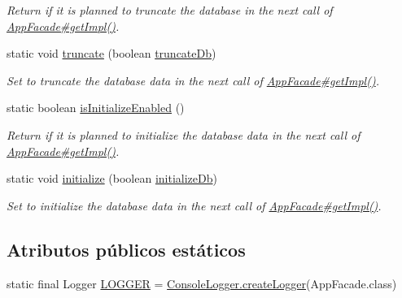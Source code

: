 \begin{DoxyCompactItemize}
\begin{DoxyCompactList}\small\item\em Return if it is planned to truncate the database in the next call of \mbox{\hyperlink{classcom_1_1ruralhousejsf_1_1business_logic_1_1_app_facade_a029bcceee98b9070b9f80abc54db45d6}{App\+Facade\#get\+Impl()}}. \end{DoxyCompactList}\item 
static void \mbox{\hyperlink{classcom_1_1ruralhousejsf_1_1business_logic_1_1_app_facade_a98aed1ed8a03c6a92e15121fed4eb452}{truncate}} (boolean \mbox{\hyperlink{classcom_1_1ruralhousejsf_1_1business_logic_1_1_app_facade_ac9cbe77035be5cc1f9bf258c57ca6564}{truncate\+Db}})
\begin{DoxyCompactList}\small\item\em Set to truncate the database data in the next call of \mbox{\hyperlink{classcom_1_1ruralhousejsf_1_1business_logic_1_1_app_facade_a029bcceee98b9070b9f80abc54db45d6}{App\+Facade\#get\+Impl()}}. \end{DoxyCompactList}\item 
static boolean \mbox{\hyperlink{classcom_1_1ruralhousejsf_1_1business_logic_1_1_app_facade_a0486115e3ba238d025e23ec62548b3bc}{is\+Initialize\+Enabled}} ()
\begin{DoxyCompactList}\small\item\em Return if it is planned to initialize the database data in the next call of \mbox{\hyperlink{classcom_1_1ruralhousejsf_1_1business_logic_1_1_app_facade_a029bcceee98b9070b9f80abc54db45d6}{App\+Facade\#get\+Impl()}}. \end{DoxyCompactList}\item 
static void \mbox{\hyperlink{classcom_1_1ruralhousejsf_1_1business_logic_1_1_app_facade_a48252ec119a6bb16f5353df6ec6eff54}{initialize}} (boolean \mbox{\hyperlink{classcom_1_1ruralhousejsf_1_1business_logic_1_1_app_facade_a08e1f188faabf8bef71610c49bdd5d84}{initialize\+Db}})
\begin{DoxyCompactList}\small\item\em Set to initialize the database data in the next call of \mbox{\hyperlink{classcom_1_1ruralhousejsf_1_1business_logic_1_1_app_facade_a029bcceee98b9070b9f80abc54db45d6}{App\+Facade\#get\+Impl()}}. \end{DoxyCompactList}\end{DoxyCompactItemize}
\subsection*{Atributos públicos estáticos}
\begin{DoxyCompactItemize}
\item 
static final Logger \mbox{\hyperlink{classcom_1_1ruralhousejsf_1_1business_logic_1_1_app_facade_a05d4beab693581eccd0ba740dc222f37}{L\+O\+G\+G\+ER}} = \mbox{\hyperlink{classcom_1_1ruralhousejsf_1_1logger_1_1_console_logger_a520321643663e37d95761134a35505cd}{Console\+Logger.\+create\+Logger}}(App\+Facade.\+class)
\end{DoxyCompactItemize}
